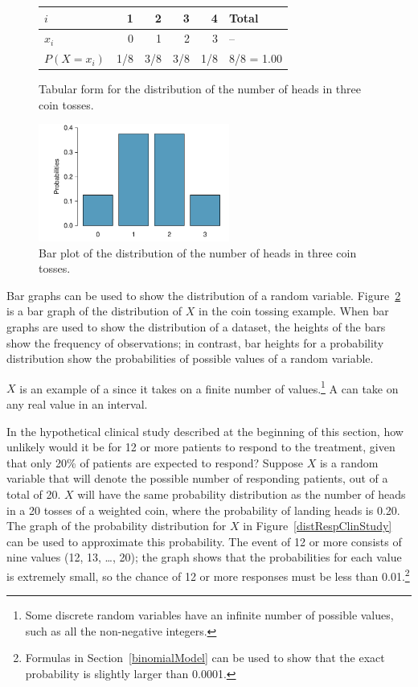 \begin{figure}[h]
	\centering 
	\begin{tabular}{l rrrr l}
		\hline 
		$i$ & 1 & 2 & 3 & 4 & Total\\
		\hline
		$x_i$ & 0 & 1 & 2 & 3 & --\\
		$P(X = x_i)$ & 1/8 & 3/8 & 3/8 & 1/8 & 8/8 = 1.00\\
	\end{tabular}
	\caption{Tabular form for the distribution of the number of heads in three coin tosses.}
	\label{distCoinTossing}
\end{figure}

\textD{\newpage}

\begin{figure}[h]
	\centering
	\includegraphics[width=0.56\textwidth]
	{ch_distributions_oi_biostat/figures/barPlotCoinTossing/barPlotCoinTossing.pdf}
	\caption{Bar plot of the distribution of the number of heads in three coin tosses.}
	\label{barPlotCoinTossing}
\end{figure}

Bar graphs can be used to show the distribution of a random variable.  Figure~\ref{barPlotCoinTossing} is a bar graph of the distribution of $X$ in the coin tossing example. When bar graphs are used to show the distribution of a dataset, the heights of the bars show the frequency of observations; in contrast, bar heights for a probability distribution show the probabilities of possible values of a random variable.

$X$ is an example of a  since it takes on a finite number of values.\footnote{Some discrete random variables have an infinite number of possible values, such as all the non-negative integers.} A  can take on any real value in an interval. 

In the hypothetical clinical study described at the beginning of this section, how unlikely would it be for 12 or more patients to respond to the treatment, given that only 20\% of patients are expected to respond? Suppose $X$ is a random variable that will denote the possible number of responding patients, out of a total of 20. $X$ will have the same probability distribution as the number of heads in a 20 tosses of a weighted coin, where the probability of landing heads is 0.20. The graph of the probability distribution for $X$ in Figure~\ref{distRespClinStudy} can be used to approximate this probability. The event of 12 or more consists of nine values (12, 13, \dots, 20); the graph shows that the probabilities for each value is extremely small, so the chance of 12 or more responses must be less than 0.01.\footnote{Formulas in Section~\ref{binomialModel} can be used to show that the exact probability is slightly larger than 0.0001.}

